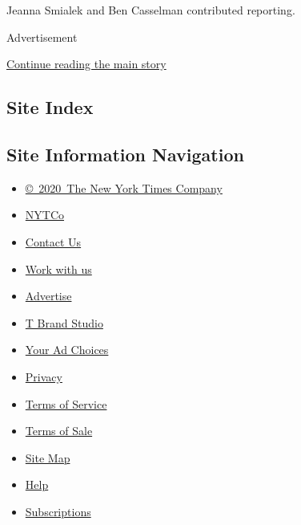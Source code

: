 Jeanna Smialek and Ben Casselman contributed reporting.

Advertisement

\protect\hyperlink{after-bottom}{Continue reading the main story}

\hypertarget{site-index}{%
\subsection{Site Index}\label{site-index}}

\hypertarget{site-information-navigation}{%
\subsection{Site Information
Navigation}\label{site-information-navigation}}

\begin{itemize}
\tightlist
\item
  \href{https://help.nytimes.com/hc/en-us/articles/115014792127-Copyright-notice}{©~2020~The
  New York Times Company}
\end{itemize}

\begin{itemize}
\tightlist
\item
  \href{https://www.nytco.com/}{NYTCo}
\item
  \href{https://help.nytimes.com/hc/en-us/articles/115015385887-Contact-Us}{Contact
  Us}
\item
  \href{https://www.nytco.com/careers/}{Work with us}
\item
  \href{https://nytmediakit.com/}{Advertise}
\item
  \href{http://www.tbrandstudio.com/}{T Brand Studio}
\item
  \href{https://www.nytimes.com/privacy/cookie-policy\#how-do-i-manage-trackers}{Your
  Ad Choices}
\item
  \href{https://www.nytimes.com/privacy}{Privacy}
\item
  \href{https://help.nytimes.com/hc/en-us/articles/115014893428-Terms-of-service}{Terms
  of Service}
\item
  \href{https://help.nytimes.com/hc/en-us/articles/115014893968-Terms-of-sale}{Terms
  of Sale}
\item
  \href{https://spiderbites.nytimes.com}{Site Map}
\item
  \href{https://help.nytimes.com/hc/en-us}{Help}
\item
  \href{https://www.nytimes.com/subscription?campaignId=37WXW}{Subscriptions}
\end{itemize}
